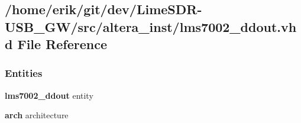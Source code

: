 \subsection{/home/erik/git/dev/\+Lime\+S\+D\+R-\/\+U\+S\+B\+\_\+\+G\+W/src/altera\+\_\+inst/lms7002\+\_\+ddout.vhd File Reference}
\label{altera__inst_2lms7002__ddout_8vhd}
\subsubsection*{Entities}
\begin{DoxyCompactItemize}
\item 
{\bf lms7002\+\_\+ddout} entity
\item 
{\bf arch} architecture
\end{DoxyCompactItemize}
